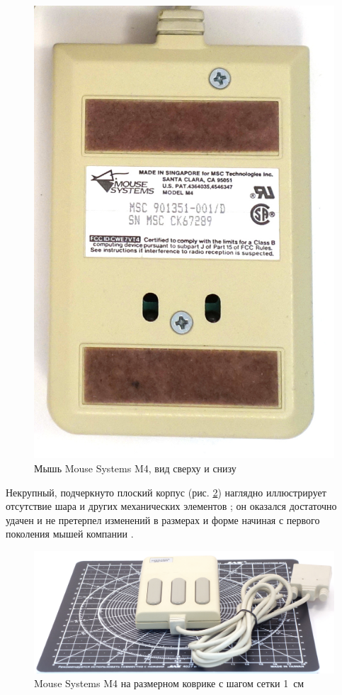 \documentclass[11pt, a4paper]{article}
\begin{document}
\begin{figure}[h]
    \includegraphics[scale=0.6]{1988_mouse_systems_m4/bottom_30.jpg}
    \caption{Мышь Mouse Systems M4, вид сверху и снизу}
    \label{fig:mscM4TopBottom}
\end{figure}

Некрупный, подчеркнуто плоский корпус (рис. \ref{fig:mscM4Size}) наглядно иллюстрирует отсутствие шара и других механических элементов \cite{pcmag}; он оказался достаточно удачен и не претерпел изменений в размерах и форме начиная с первого поколения мышей компании \cite{old}.

\begin{figure}[h]
    \centering
    \includegraphics[scale=0.5]{1988_mouse_systems_m4/size_30.jpg}
    \caption{Mouse Systems M4 на размерном коврике с шагом сетки 1~см}
    \label{fig:mscM4Size}
\end{figure}
\end{document}
